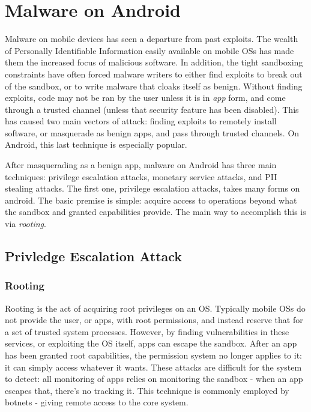 \chapter{Malware on Android}
\label{sec:malware}

Malware on mobile devices has seen a departure from past exploits. The wealth of Personally Identifiable Information easily available on mobile OSs has made them the increased focus of malicious software. In addition, the tight sandboxing constraints have often forced malware writers to either find exploits to break out of the sandbox, or to write malware that cloaks itself as benign. Without finding exploits, code may not be ran by the user unless it is in \textit{app} form, and come through a trusted channel (unless that security feature has been disabled). This has caused two main vectors of attack: finding exploits to remotely install software, or masquerade as benign apps, and pass through trusted channels. On Android, this last technique is especially popular. 

After masquerading as a benign app, malware on Android has three main techniques: privilege escalation attacks, monetary service attacks, and PII stealing attacks. The first one, privilege escalation attacks, takes many forms on android. The basic premise is simple: acquire access to operations beyond what the sandbox and granted capabilities provide. The main way to accomplish this is via \textit{rooting}.

\section{Privledge Escalation Attack}
\subsection{Rooting}
Rooting is the act of acquiring root privileges on an OS. Typically mobile OSs do not provide the user, or apps, with root permissions, and instead reserve that for a set of trusted system processes. However, by finding vulnerabilities in these services, or exploiting the OS itself, apps can escape the sandbox. After an app has been granted root capabilities, the permission system no longer applies to it: it can simply access whatever it wants. These attacks are difficult for the system to detect: all monitoring of apps relies on monitoring the sandbox - when an app escapes that, there’s no tracking it. This technique is commonly employed by botnets - giving remote access to the core system. 

